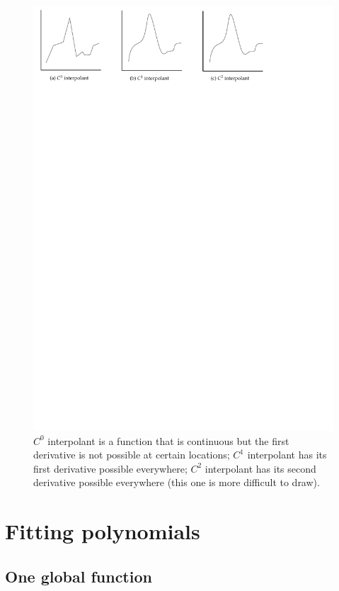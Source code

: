 \begin{figure}
  \centering
  \includegraphics[width=0.9\linewidth]{figs/continuity}
  \caption{$C^0$ interpolant is a function that is continuous but the first derivative is not possible at certain locations; $C^1$ interpolant has its first derivative possible everywhere; $C^2$ interpolant has its second derivative possible everywhere (this one is more difficult to draw).}
\label{fig:continuity}
\end{figure}



\section{Fitting polynomials}


%
\subsection{One global function}

